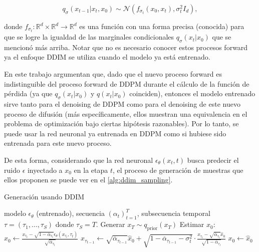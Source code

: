 \begin{equation*}
    q_\sigma(x_{t-1}|x_t,x_0)\sim\mathcal{N}\left(f_{\sigma_t}(x_0,x_t),\sigma_t^2 I_d\right),
\end{equation*}

donde $f_{\sigma_t}:\mathbb{R}^d\times\mathbb{R}^d\to\mathbb{R}^d$ es una función con una forma precisa (conocida) para que se logre la igualdad de las marginales condicionales $q_\sigma(x_t|x_0)$ que se mencionó más arriba. Notar que no es necesario conocer estos procesos forward ya el enfoque DDIM se utiliza cuando el modelo ya está entrenado.

En este trabajo argumentan que, dado que el nuevo proceso forward es indistinguible del proceso forward de DDPM durante el cálculo de la función de pérdida (ya que $q_\sigma(x_t|x_0)$ y $q(x_t|x_0)$ coinciden), entonces el modelo entrenado sirve tanto para el denoising de DDPM como para el denoising de este nuevo proceso de difusión (más específicamente, ellos muestran una equivalencia en el problema de optimización bajo ciertas hipótesis razonables). Por lo tanto, se puede usar la red neuronal ya entrenada en DDPM como si hubiese sido entrenada para este nuevo proceso.

De esta forma, considerando que la red neuronal $\epsilon_\theta(x_t,t)$ busca predecir el ruido $\epsilon$ inyectado a $x_0$ en la etapa $t$, el proceso de generación de muestras que ellos proponen se puede ver en el \autoref{alg:ddim_sampling}.

\begin{algorithm}
    \caption{Generación usando DDIM}
    \label{alg:ddim_sampling}
    \begin{algorithmic}[1]
        \Require modelo $\epsilon_\theta$ (entrenado), secuencia $(\alpha_t)_{t=1}^T$, subsecuencia temporal $\tau = (\tau_1, ..., \tau_S)$ donde $\tau_S = T$.
        \State Generar $x_T \sim q_{\text{prior}}(x_T)$
        \State Estimar $x_0$: $\hat{x}_0 \gets \frac{x_{\tau_t} - \sqrt{1-\overline{\alpha}_{\tau_t}}\epsilon_\theta(x_{\tau_t},\tau_t)}{\sqrt{\overline{\alpha}_{\tau_t}}}$
        \State $x_{\tau_{t-1}} \gets \sqrt{\overline{\alpha}_{\tau_{t-1}}}\hat{x}_0 + \sqrt{1-\overline{\alpha}_{\tau_{t-1}}-\sigma_t^2}\cdot\frac{x_{\tau_t}-\sqrt{\overline{\alpha}_{\tau_t}}\hat{x}_0}{\sqrt{1-\overline{\alpha}_{\tau_t}}}$
        \EndIf
        \EndFor
        \State \Return $x_0 \gets \hat{x}_0$
    \end{algorithmic}
\end{algorithm}

